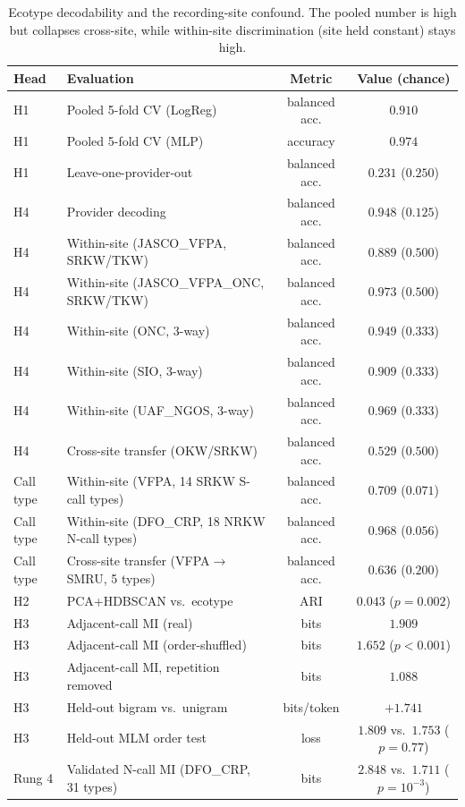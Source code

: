 \documentclass[11pt]{article}
\begin{document}
\begin{table}[t]
\centering
\caption{Ecotype decodability and the recording-site confound. The pooled number is high but
collapses cross-site, while within-site discrimination (site held constant) stays high.}
\label{tab:main}
\begin{tabular}{llcc}
\toprule
Head & Evaluation & Metric & Value (chance) \\
\midrule
H1 & Pooled 5-fold CV (LogReg) & balanced acc. & $0.910$ \\
H1 & Pooled 5-fold CV (MLP) & accuracy & $0.974$ \\
H1 & Leave-one-provider-out & balanced acc. & $0.231$ ($0.250$) \\
H4 & Provider decoding & balanced acc. & $0.948$ ($0.125$) \\
H4 & Within-site (JASCO\_VFPA, SRKW/TKW) & balanced acc. & $0.889$ ($0.500$) \\
H4 & Within-site (JASCO\_VFPA\_ONC, SRKW/TKW) & balanced acc. & $0.973$ ($0.500$) \\
H4 & Within-site (ONC, 3-way) & balanced acc. & $0.949$ ($0.333$) \\
H4 & Within-site (SIO, 3-way) & balanced acc. & $0.909$ ($0.333$) \\
H4 & Within-site (UAF\_NGOS, 3-way) & balanced acc. & $0.969$ ($0.333$) \\
H4 & Cross-site transfer (OKW/SRKW) & balanced acc. & $0.529$ ($0.500$) \\
Call type & Within-site (VFPA, 14 SRKW S-call types) & balanced acc. & $0.709$ ($0.071$) \\
Call type & Within-site (DFO\_CRP, 18 NRKW N-call types) & balanced acc. & $0.968$ ($0.056$) \\
Call type & Cross-site transfer (VFPA$\to$SMRU, 5 types) & balanced acc. & $0.636$ ($0.200$) \\
H2 & PCA+HDBSCAN vs.\ ecotype & ARI & $0.043$ ($p=0.002$) \\
H3 & Adjacent-call MI (real) & bits & $1.909$ \\
H3 & Adjacent-call MI (order-shuffled) & bits & $1.652$ ($p<0.001$) \\
H3 & Adjacent-call MI, repetition removed & bits & $1.088$ \\
H3 & Held-out bigram vs.\ unigram & bits/token & $+1.741$ \\
H3 & Held-out MLM order test & loss & $1.809$ vs.\ $1.753$ ($p=0.77$) \\
Rung 4 & Validated N-call MI (DFO\_CRP, 31 types) & bits & $2.848$ vs.\ $1.711$ ($p=10^{-3}$) \\

\end{tabular}
\end{table}
\end{document}
